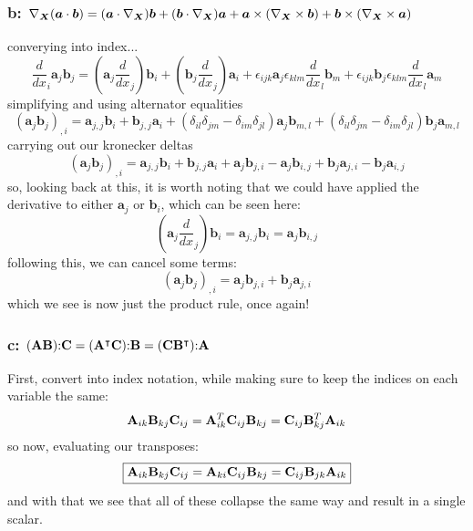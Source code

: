 \subsubsection*{b: $\nabla_{\bm{X}} (\bm{a} \cdot \bm{b}) = (\bm{a} \cdot \nabla_{\bm{X}}) \bm{b} + (\bm{b} \cdot \nabla_{\bm{X}}) \bm{a} + \bm{a} \times (\nabla_{\bm{X}} \times \bm{b}) + \bm{b} \times (\nabla_{\bm{X}} \times \bm{a})$}
converying into index...
\begin{equation}
    \frac{d}{dx}_i\bm{a}_j\bm{b}_j = (\bm{a}_j\frac{d}{dx}_j)\bm{b}_i+(\bm{b}_j\frac{d}{dx}_j)\bm{a}_i +\epsilon_{ijk}\bm{a}_j\epsilon_{klm}\frac{d}{dx}_l\bm{b}_m+\epsilon_{ijk}\bm{b}_j\epsilon_{klm}\frac{d}{dx}_l\bm{a}_m
\end{equation}
simplifying and using alternator equalities
\begin{equation}
    (\bm{a}_j\bm{b}_j)_{,i} = \bm{a}_{j,j}\bm{b}_i+\bm{b}_{j,j}\bm{a}_i+(\delta_{il}\delta_{jm}-\delta_{im}\delta_{jl})\bm{a}_j\bm{b}_{m,l}+(\delta_{il}\delta_{jm}-\delta_{im}\delta_{jl})\bm{b}_j\bm{a}_{m,l}
\end{equation}
carrying out our kronecker deltas
\begin{equation}
    (\bm{a}_j\bm{b}_j)_{,i} = \bm{a}_{j,j}\bm{b}_i+\bm{b}_{j,j}\bm{a}_i+\bm{a}_j\bm{b}_{j,i}-\bm{a}_j\bm{b}_{i,j}+\bm{b}_j\bm{a}_{j,i}-\bm{b}_j\bm{a}_{i,j}
\end{equation}
so, looking back at this, it is worth noting that we could have applied the derivative to either $\bm{a}_j$ or $\bm{b}_i$, which can be seen here:
\begin{equation}
    (\bm{a}_j\frac{d}{dx}_j)\bm{b}_i =  \bm{a}_{j,j}\bm{b}_i =  \bm{a}_{j}\bm{b}_{i,j}
\end{equation}
following this, we can cancel some terms:
\begin{equation}
    \boxed{(\bm{a}_j\bm{b}_j)_{,i} = \bm{a}_j\bm{b}_{j,i}+\bm{b}_j\bm{a}_{j,i}}
\end{equation}
which we see is now just the product rule, once again!

\subsubsection*{c: $ (\mathbf{A} \mathbf{B}) \mathbf{:} \mathbf{C} = (\mathbf{A}^\intercal \mathbf{C})\mathbf{:} \mathbf{B} = (\mathbf{C} \mathbf{B}^\intercal)\mathbf{:} \mathbf{A}$}
First, convert into index notation, while making sure to keep the indices on each variable the same:
\begin{equation}
    \mathbf{A}_{ik} \mathbf{B}_{kj}\mathbf{C}_{ij} = \mathbf{A}_{ik}^T\mathbf{C}_{ij}\mathbf{B}_{kj} = \mathbf{C}_{ij}\mathbf{B}_{kj}^T\mathbf{A}_{ik}
\end{equation}
so now, evaluating our transposes:
\begin{equation}
    \boxed{\mathbf{A}_{ik} \mathbf{B}_{kj}\mathbf{C}_{ij} = \mathbf{A}_{ki}\mathbf{C}_{ij}\mathbf{B}_{kj} = \mathbf{C}_{ij}\mathbf{B}_{jk}\mathbf{A}_{ik}}
\end{equation}
and with that we see that all of these collapse the same way and result in a single scalar.


